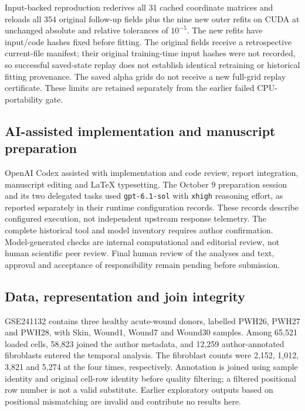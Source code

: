 Input-backed reproduction rederives all 31 cached coordinate matrices and reloads all 354 original follow-up fields plus the nine new outer refits on CUDA at unchanged absolute and relative tolerances of $10^{-5}$. The new refits have input/code hashes fixed before fitting. The original fields receive a retrospective current-file manifest; their original training-time input hashes were not recorded, so successful saved-state replay does not establish identical retraining or historical fitting provenance. The saved alpha grids do not receive a new full-grid replay certificate. These limits are retained separately from the earlier failed CPU-portability gate.

\subsection{AI-assisted implementation and manuscript preparation}
OpenAI Codex assisted with implementation and code review, report integration, manuscript editing and LaTeX typesetting. The October 9 preparation session and its two delegated tasks used \texttt{gpt-6.1-sol} with \texttt{xhigh} reasoning effort, as reported separately in their runtime configuration records. These records describe configured execution, not independent upstream response telemetry. The complete historical tool and model inventory requires author confirmation. Model-generated checks are internal computational and editorial review, not human scientific peer review. Final human review of the analyses and text, approval and acceptance of responsibility remain pending before submission.

\subsection{Data, representation and join integrity}
GSE241132 contains three healthy acute-wound donors, labelled PWH26, PWH27 and PWH28, with Skin, Wound1, Wound7 and Wound30 samples. Among 65,521 loaded cells, 58,823 joined the author metadata, and 12,259 author-annotated fibroblasts entered the temporal analysis. The fibroblast counts were 2,152, 1,012, 3,821 and 5,274 at the four times, respectively. Annotation is joined using sample identity and original cell-row identity before quality filtering; a filtered positional row number is not a valid substitute. Earlier exploratory outputs based on positional mismatching are invalid and contribute no results here.

